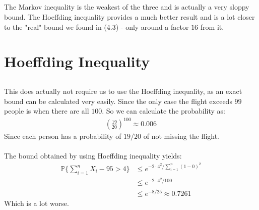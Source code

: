 \documentclass[a4paper]{article}
\begin{document}
\subsection{}
The Markov inequality is the weakest of the three and is actually a very sloppy bound. The Hoeffding inequality provides a much better result and is a lot closer to the "real" bound we found in (4.3) - only around a factor $16$ from it.

\section{Hoeffding Inequality}
\subsection{}
This does actually not require us to use the Hoeffding inequality, as an exact bound can be calculated very easily. Since the only case the flight exceeds $99$ people is when there are all $100$. So we can calculate the probability as:
\begin{align*}
\left(\frac{19}{20}\right)^{100}\approx 0.006
\end{align*}
Since each person has a probability of $19/20$ of not missing the flight. \\
\\
The bound obtained by using Hoeffding inequality yields:
\begin{align*}
\mathbb{P}\{\sum_{i=1}^nX_i-95 > 4\}&\leq e^{-2\cdot 4^2/\sum_{i=1}^n(1-0)^2} \\
&\leq e^{-2\cdot 4^2/100} \\
&\leq e^{-8/25}\approx 0.7261
\end{align*}
Which is a lot worse.
\end{document}
